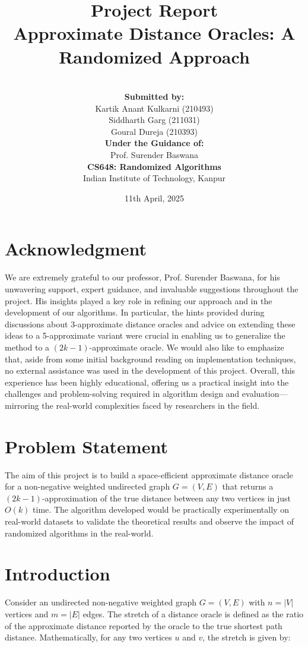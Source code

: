 \documentclass{article}
\title{\textbf{Project Report}\\[0.5em] \Large \textbf{Approximate Distance Oracles: A Randomized Approach}}
\author{
    \vspace{0.5cm} \\
    \textbf{Submitted by:} \\[0.5em]
    Kartik Anant Kulkarni (210493) \\ 
    Siddharth Garg (211031) \\ 
    Goural Dureja (210393) \\[1.5em]
    \textbf{Under the Guidance of:} \\[0.5em]
    Prof. Surender Baswana \\[1.5em]
    \textbf{CS648: Randomized Algorithms} \\ 
    Indian Institute of Technology, Kanpur
}
\date{11th April, 2025}
\begin{document}
\maketitle

\vspace{1cm}

\section*{Acknowledgment}

We are extremely grateful to our professor, Prof. Surender Baswana, for his unwavering support, expert guidance, and invaluable suggestions throughout the project. His insights played a key role in refining our approach and in the development of our algorithms. In particular, the hints provided during discussions about 3-approximate distance oracles and advice on extending these ideas to a 5-approximate variant were crucial in enabling us to generalize the method to a \((2k-1)\)-approximate oracle. We would also like to emphasize that, aside from some initial background reading on implementation techniques, no external assistance was used in the development of this project. Overall, this experience has been highly educational, offering us a practical insight into the challenges and problem-solving required in algorithm design and evaluation—mirroring the real-world complexities faced by researchers in the field.

\newpage

\tableofcontents

\newpage

\section{Problem Statement}
The aim of this project is to build a space-efficient approximate distance oracle for a non-negative weighted undirected graph \(G=(V,E)\) that returns a \((2k-1)\)-approximation of the true distance between any two vertices in just \(O(k)\) time. The algorithm developed would be practically experimentally on real-world datasets to validate the theoretical results and observe the impact of randomized algorithms in the real-world. 

\section{Introduction}

Consider an undirected non-negative weighted graph \(G = (V, E)\) with \(n = |V|\) vertices and \(m = |E|\) edges. The stretch of a distance oracle is defined as the ratio of the approximate distance reported by the oracle to the true shortest path distance. Mathematically, for any two vertices \(u\) and \(v\), the stretch is given by:
\end{document}
